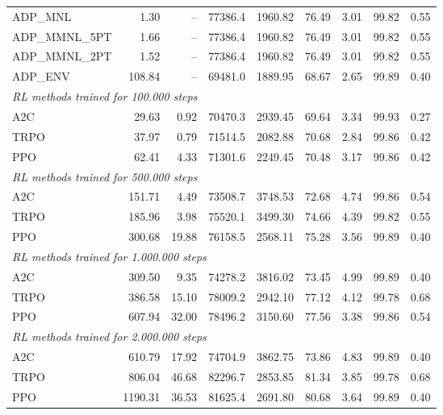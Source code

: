 \begin{samepage}
\begin{center}
\begin{tabular}{l|rr|rr|rr|rr}
    ADP\_MNL     &     1.30 &    -- &    77386.4 &    1960.82 &   76.49 &    3.01 &   99.82 &    0.55 \\
    ADP\_MMNL\_5PT &     1.66 &    -- &    77386.4 &    1960.82 &   76.49 &    3.01 &   99.82 &    0.55 \\
    ADP\_MMNL\_2PT &     1.52 &    -- &    77386.4 &    1960.82 &   76.49 &    3.01 &   99.82 &    0.55 \\
    ADP\_ENV     &   108.84 &    -- &    69481.0 &    1889.95 &   68.67 &    2.65 &   99.89 &    0.40 \\
    \midrule
    \multicolumn{9}{l}{\textit{RL methods trained for 100.000 steps}} \\
    \midrule
    A2C          &    29.63 &     0.92 &    70470.3 &    2939.45 &   69.64 &    3.34 &   99.93 &    0.27 \\
    TRPO         &    37.97 &     0.79 &    71514.5 &    2082.88 &   70.68 &    2.84 &   99.86 &    0.42 \\
    PPO          &    62.41 &     4.33 &    71301.6 &    2249.45 &   70.48 &    3.17 &   99.86 &    0.42 \\
    \midrule
    \multicolumn{9}{l}{\textit{RL methods trained for 500.000 steps}} \\
    \midrule
    A2C          &   151.71 &     4.49 &    73508.7 &    3748.53 &   72.68 &    4.74 &   99.86 &    0.54 \\
    TRPO         &   185.96 &     3.98 &    75520.1 &    3499.30 &   74.66 &    4.39 &   99.82 &    0.55 \\
    PPO          &   300.68 &    19.88 &    76158.5 &    2568.11 &   75.28 &    3.56 &   99.89 &    0.40 \\
    \midrule
    \multicolumn{9}{l}{\textit{RL methods trained for 1.000.000 steps}} \\
    \midrule
    A2C          &   309.50 &     9.35 &    74278.2 &    3816.02 &   73.45 &    4.99 &   99.89 &    0.40 \\
    TRPO         &   386.58 &    15.10 &    78009.2 &    2942.10 &   77.12 &    4.12 &   99.78 &    0.68 \\
    PPO          &   607.94 &    32.00 &    78496.2 &    3150.60 &   77.56 &    3.38 &   99.86 &    0.54 \\
    \midrule
    \multicolumn{9}{l}{\textit{RL methods trained for 2.000.000 steps}} \\
    \midrule
    A2C          &   610.79 &    17.92 &    74704.9 &    3862.75 &   73.86 &    4.83 &   99.89 &    0.40 \\
    TRPO         &   806.04 &    46.68 &    82296.7 &    2853.85 &   81.34 &    3.85 &   99.78 &    0.68 \\
    PPO          &  1190.31 &    36.53 &    81625.4 &    2691.80 &   80.68 &    3.64 &   99.89 &    0.40 \\
    \bottomrule
  \end{tabular}
\end{center}
\end{samepage}

